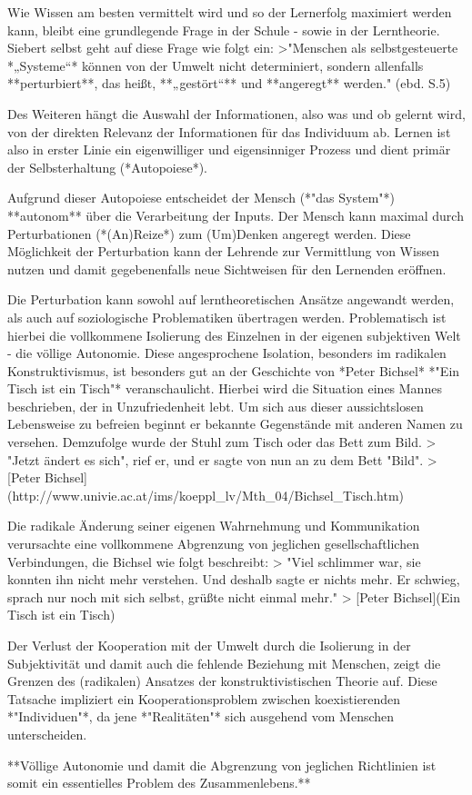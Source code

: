 Wie Wissen am besten vermittelt wird und so der Lernerfolg maximiert werden kann, bleibt eine grundlegende Frage in der Schule - sowie in der Lerntheorie.
Siebert selbst geht auf diese Frage wie folgt ein:
>"Menschen als selbstgesteuerte *„Systeme“* können von der Umwelt nicht determiniert, sondern allenfalls **perturbiert**, das heißt, **„gestört“** und **angeregt** werden." (ebd. S.5)

Des Weiteren hängt die Auswahl der Informationen, also was und ob gelernt wird, von der direkten Relevanz der Informationen für das Individuum ab.
Lernen ist also in erster Linie ein eigenwilliger und eigensinniger Prozess und dient primär der Selbsterhaltung (*Autopoiese*).

Aufgrund dieser Autopoiese entscheidet der Mensch (*"das System"*) **autonom** über die Verarbeitung der Inputs.
Der Mensch kann maximal durch Perturbationen (*(An)Reize*) zum (Um)Denken angeregt werden.
Diese Möglichkeit der Perturbation kann der Lehrende zur Vermittlung von Wissen nutzen und damit gegebenenfalls neue Sichtweisen für den Lernenden eröffnen.

Die Perturbation kann sowohl auf lerntheoretischen Ansätze angewandt werden, als auch auf soziologische Problematiken übertragen werden.
Problematisch ist hierbei die vollkommene Isolierung des Einzelnen in der eigenen subjektiven Welt - die völlige Autonomie.
Diese angesprochene Isolation, besonders im radikalen Konstruktivismus, ist besonders gut an der Geschichte von *Peter Bichsel* *"Ein Tisch ist ein Tisch"* veranschaulicht.
Hierbei wird die Situation eines Mannes beschrieben, der in Unzufriedenheit lebt.
Um sich aus dieser aussichtslosen Lebensweise zu befreien beginnt er bekannte Gegenstände mit anderen Namen zu versehen.
Demzufolge wurde der Stuhl zum Tisch oder das Bett zum Bild.
> "Jetzt ändert es sich", rief er, und er sagte von nun an zu dem Bett "Bild".
> [Peter Bichsel](http://www.univie.ac.at/ims/koeppl_lv/Mth_04/Bichsel_Tisch.htm)

Die radikale Änderung seiner eigenen Wahrnehmung und Kommunikation verursachte eine vollkommene Abgrenzung von jeglichen gesellschaftlichen Verbindungen, die Bichsel wie folgt beschreibt:
> "Viel schlimmer war, sie konnten ihn nicht mehr verstehen. Und deshalb sagte er nichts mehr. Er schwieg, sprach nur noch mit sich selbst, grüßte nicht einmal mehr."
> [Peter Bichsel](Ein Tisch ist ein Tisch)

Der Verlust der Kooperation mit der Umwelt durch die Isolierung in der Subjektivität und damit auch die fehlende Beziehung mit Menschen, zeigt die Grenzen des (radikalen) Ansatzes der konstruktivistischen Theorie auf.
Diese Tatsache impliziert ein Kooperationsproblem zwischen koexistierenden *"Individuen"*, da jene *"Realitäten"* sich ausgehend vom Menschen unterscheiden.

**Völlige Autonomie und damit die Abgrenzung von jeglichen Richtlinien ist somit ein essentielles Problem des Zusammenlebens.**
